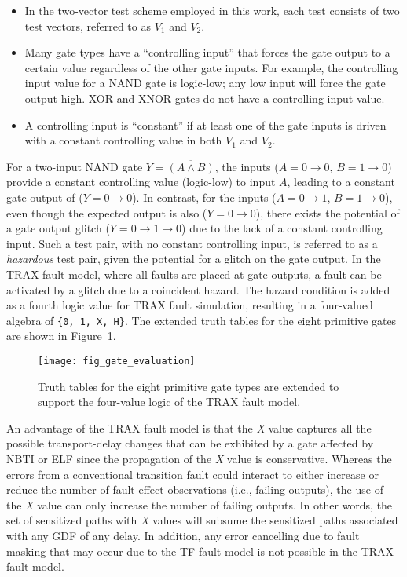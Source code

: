 \begin{itemize}
\item In the two-vector test scheme employed in this work, each test consists of two test vectors, referred to as $V_1$ and $V_2$.
\item Many gate types have a ``controlling input'' that forces the gate output to a certain value regardless of the other gate inputs.
%
For example, the controlling input value for a NAND gate is logic-low; any low input will force the gate output high.
%
XOR and XNOR gates do not have a controlling input value.
\item A controlling input is ``constant'' if at least one of the gate inputs is driven with a constant controlling value in both $V_1$ and $V_2$.
\end{itemize}

For a two-input NAND gate $Y = \overline{(A \land B)}$, the inputs ($A = 0 \rightarrow 0$, $B = 1 \rightarrow 0$) provide a constant controlling value (logic-low) to input $A$, leading to a constant gate output of ($Y = 0 \rightarrow 0$).
%
In contrast, for the inputs ($A = 0 \rightarrow 1$, $B = 1 \rightarrow 0$), even though the expected output is also ($Y = 0 \rightarrow 0$), there exists the potential of a gate output glitch ($Y = 0 \rightarrow 1 \rightarrow 0$) due to the lack of a constant controlling input.
%
Such a test pair, with no constant controlling input, is referred to as a \textit{hazardous} test pair, given the potential for a glitch on the gate output.
%
In the TRAX fault model, where all faults are placed at gate outputs, a fault can be activated by a glitch due to a coincident hazard.
%
The hazard condition is added as a fourth logic value for TRAX fault simulation, resulting in a four-valued algebra of \verb+{0, 1, X, H}+.
%
The extended truth tables for the eight primitive gates are shown in Figure~\ref{fig:trax_gate_evaluation}.

\begin{figure}[htbp]
\centering
\texttt{[image: fig\_gate\_evaluation]}
\caption{Truth tables for the eight primitive gate types are extended to support the four-value logic of the TRAX fault model.}
\label{fig:trax_gate_evaluation}
\end{figure}

An advantage of the TRAX fault model is that the \textit{X} value captures all the possible transport-delay changes that can be exhibited by a gate affected by NBTI or ELF since the propagation of the \textit{X} value is conservative.
%
Whereas the errors from a conventional transition fault could interact to either increase or reduce the number of fault-effect observations (i.e., failing outputs), the use of the \textit{X} value can only increase the number of failing outputs.
%
In other words, the set of sensitized paths with \textit{X} values will subsume the sensitized paths associated with any GDF of any delay.
%
In addition, any error cancelling due to fault masking that may occur due to the TF fault model is not possible in the TRAX fault model.

